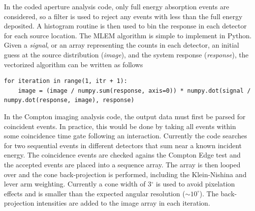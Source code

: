 \documentclass[10pt]{article}
\begin{document}

In the coded aperture analysis code, only full energy absorption events are considered, so a filter is used to reject any events with less than the full energy deposited. A histogram routine is then used to bin the response in each detector for each source location. The MLEM algorithm is simple to implement in Python. Given a \emph{signal}, or an array representing the counts in each detector, an initial guess at the source distribution (\emph{image}), and the system response (\emph{response}), the vectorized algorithm can be written as follows

\begin{lstlisting}
for iteration in range(1, itr + 1):
	image = (image / numpy.sum(response, axis=0)) * numpy.dot(signal / numpy.dot(response, image), response)
\end{lstlisting}

In the Compton imaging analysis code, the output data must first be parsed for coincident events. In practice, this would be done by taking all events within some coincidence time gate following an interaction. Currently the code searches for two sequential events in different detectors that sum near a known incident energy. The coincidence events are checked agains the Compton Edge test and the accepted events are placed into a sequence array. The array is then looped over and the cone back-projection is performed, including the Klein-Nishina and lever arm weighting. Currently a cone width of 3$^\circ$ is used to avoid pixelation effects and is smaller than the expected angular resolution ($\sim10^\circ$). The back-projection intensities are added to the image array in each iteration.
\end{document}
